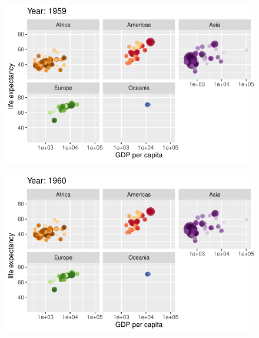 \documentclass[
  letterpaper,
  DIV=11,
  numbers=noendperiod]{scrartcl}
\begin{document}
\begin{figure}[H]

{\centering \includegraphics{class05_files/figure-pdf/unnamed-chunk-24-14.pdf}

}

\end{figure}

\begin{figure}[H]

{\centering \includegraphics{class05_files/figure-pdf/unnamed-chunk-24-15.pdf}

}

\end{figure}
\end{document}
